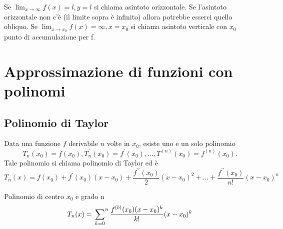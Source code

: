Se $\lim_{x\to \infty}f(x)=l, y=l$ si chiama asintoto orizzontale.
Se l'asintoto orizzontale non c'è (il limite sopra è infinito) allora potrebbe
esserci quello obliquo. Se $\lim_{x\to x_0}f(x)=\infty, x=x_0$ si chiama
asintoto verticale con $x_0$ punto di accumulazione per f.
\section{Approssimazione di funzioni con polinomi}
\subsection{Polinomio di Taylor}
Data una funzione $f$ derivabile $n$ volte in $x_0$, esiste uno e un solo
polinomio
\begin{equation}
	T_n(x_0)=f(x_0),T^\prime_n(x_0)=f^\prime(x_0),\dots, T^{(n)}(x_0)=f^{(n)}(x_0).
\end{equation}
Tale polinomio si chiama polinomio di Taylor ed è
\begin{equation}
	T_n(x)=f(x_0)+f^\prime(x_0)(x-x_0)+\frac{f^{\prime\prime}(x_0)}{2}(x-x_0)^2+\dots
	+ \frac{f^{\prime\prime}(x_0)}{n!}(x-x_0)^n
\end{equation}

Polinomio di centro $x_0$ e grado n
\begin{equation}
	T_n(x)=\sideset{}{^n}\sum_{k=0}\frac{f^{(b)}(x_0)(x-x_0)^k}{k!}(x-x_0)^k
\end{equation}

